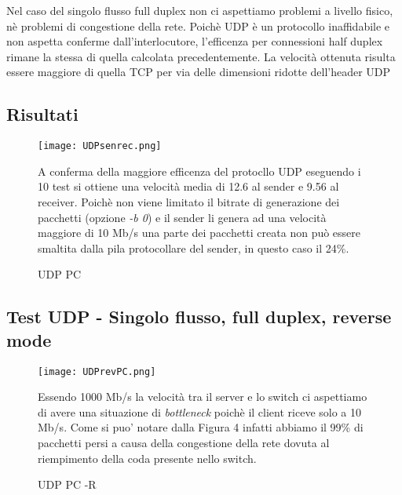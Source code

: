 \documentclass[../lab2.tex]{subfiles}
\begin{document}
            Nel caso del singolo flusso full duplex non ci aspettiamo problemi a livello fisico, nè problemi di congestione della rete.
            Poichè UDP è un protocollo inaffidabile e non aspetta conferme dall'interlocutore, l'efficenza per connessioni
            half duplex rimane la stessa di quella calcolata precedentemente.
            La velocità ottenuta risulta essere maggiore di quella TCP per via delle dimensioni ridotte dell'header UDP 

            \subsection{Risultati}

            \begin{figure}[!h]
                \begin{minipage}{0.48\textwidth}
                    \centering
                    \texttt{[image: UDPsenrec.png]}
                    \vspace{-20pt}
                    \caption{UDP PC}\label{UDPPC}
                \end{minipage}\hfill
                \begin{minipage}{0.48\textwidth}
                    A conferma della maggiore efficenza del protocllo UDP eseguendo i 10 test si ottiene una velocità media 
                    di 12.6 al sender e 9.56 al receiver. Poichè non viene limitato il bitrate di generazione dei pacchetti 
                    (opzione \textit{-b 0}) e il sender li genera ad una velocità maggiore di 10 Mb/s una parte 
                    dei pacchetti creata non può essere smaltita dalla pila protocollare del sender, in questo caso il 24\%.
                \end{minipage}
            \end{figure}

            \subsection{Test UDP - Singolo flusso, full duplex, reverse mode}
            \begin{figure}[!htb]
                \begin{minipage}{0.48\textwidth}
                    \centering
                    \texttt{[image: UDPrevPC.png]}
                    \vspace{-20pt}
                    \caption{UDP PC -R}\label{UDPPCR}
                \end{minipage}\hfill
                \begin{minipage}{0.48\textwidth}
                    Essendo 1000 Mb/s la velocità tra il server e lo switch ci aspettiamo di avere una situazione di \textit{bottleneck} poichè il client riceve solo a 10 Mb/s. Come si puo' notare dalla Figura 4 infatti abbiamo
                    il 99\% di pacchetti persi a causa della congestione della rete dovuta al riempimento della coda presente
                    nello switch.    
                \end{minipage}
            \end{figure}
\end{document}
